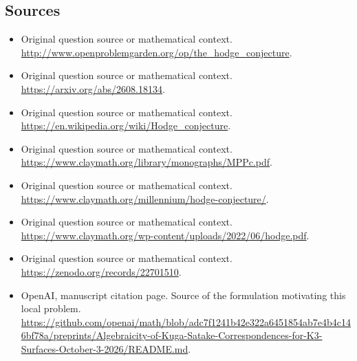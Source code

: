 \documentclass[11pt]{article}
\begin{document}
\subsection{Sources}
\begin{itemize}
\item[S1] Original question source or mathematical context.
\url{http://www.openproblemgarden.org/op/the_hodge_conjecture}.
\item[S2] Original question source or mathematical context.
\url{https://arxiv.org/abs/2608.18134}.
\item[S3] Original question source or mathematical context.
\url{https://en.wikipedia.org/wiki/Hodge_conjecture}.
\item[S4] Original question source or mathematical context.
\url{https://www.claymath.org/library/monographs/MPPc.pdf}.
\item[S5] Original question source or mathematical context.
\url{https://www.claymath.org/millennium/hodge-conjecture/}.
\item[S6] Original question source or mathematical context.
\url{https://www.claymath.org/wp-content/uploads/2022/06/hodge.pdf}.
\item[S7] Original question source or mathematical context.
\url{https://zenodo.org/records/22701510}.
\item[S8] OpenAI, manuscript citation page. Source of the formulation motivating this local problem.
\url{https://github.com/openai/math/blob/adc7f1241b42e322a6451854ab7e4b4c146bf78a/preprints/Algebraicity-of-Kuga-Satake-Correspondences-for-K3-Surfaces-October-3-2026/README.md}.
\end{itemize}
\end{document}
